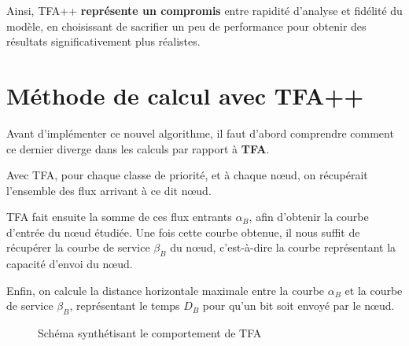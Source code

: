 \documentclass[12pt]{report}
\begin{document}
\bigskip

Ainsi, TFA++ \textbf{représente un compromis} entre rapidité 
d'analyse et fidélité du modèle, en choisissant de 
sacrifier un peu de performance pour obtenir des résultats 
significativement plus réalistes.

\break{}

\section{Méthode de calcul avec TFA++}

Avant d'implémenter ce nouvel algorithme, il faut d'abord
comprendre comment ce dernier diverge dans les calculs par
rapport à \textbf{TFA}.

\bigskip

Avec TFA, pour chaque classe de priorité, et à chaque nœud,
on récupérait l'ensemble des flux arrivant à ce dit nœud.

\smallskip

TFA fait ensuite la somme de ces flux entrants $\alpha_B$, afin d'obtenir la 
courbe d'entrée du nœud étudiée. Une fois cette courbe obtenue,
il nous suffit de récupérer la courbe de service $\beta_B$ du nœud,
c'est-à-dire la courbe représentant la capacité d'envoi du nœud.

\smallskip

Enfin, on calcule la distance horizontale maximale entre la courbe $\alpha_B$
et la courbe de service $\beta_B$, représentant le temps $D_B$ pour qu'un bit
soit envoyé par le nœud.

\bigskip

\vspace{0.5cm}

\begin{figure}[h!]
\begin{center}
\end{center}
\caption{Schéma synthétisant le comportement de TFA}
\end{figure}
\end{document}
